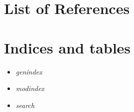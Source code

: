 \documentclass[letterpaper,10pt,english]{sphinxmanual}
\begin{document}
\chapter{List of References}
\label{references:list-of-references}\label{references::doc}

\chapter{Indices and tables}
\label{index:indices-and-tables}\begin{itemize}
\item {} 
\emph{genindex}

\item {} 
\emph{modindex}

\item {} 
\emph{search}

\end{itemize}
\end{document}
